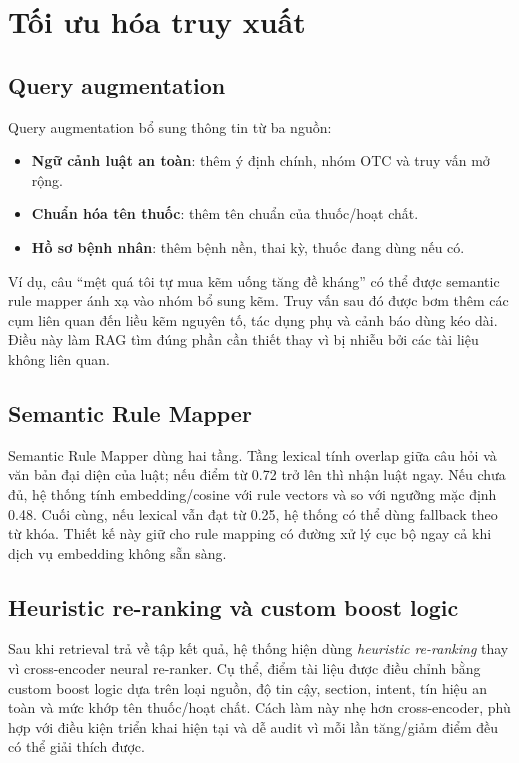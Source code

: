 \section{Tối ưu hóa truy xuất}

\subsection{Query augmentation}

Query augmentation bổ sung thông tin từ ba nguồn:

\begin{itemize}
  \item \textbf{Ngữ cảnh luật an toàn}: thêm ý định chính, nhóm OTC và truy vấn mở rộng.
  \item \textbf{Chuẩn hóa tên thuốc}: thêm tên chuẩn của thuốc/hoạt chất.
  \item \textbf{Hồ sơ bệnh nhân}: thêm bệnh nền, thai kỳ, thuốc đang dùng nếu có.
\end{itemize}

Ví dụ, câu ``mệt quá tôi tự mua kẽm uống tăng đề kháng'' có thể được semantic rule mapper ánh xạ vào nhóm bổ sung kẽm. Truy vấn sau đó được bơm thêm các cụm liên quan đến liều kẽm nguyên tố, tác dụng phụ và cảnh báo dùng kéo dài. Điều này làm RAG tìm đúng phần cần thiết thay vì bị nhiễu bởi các tài liệu không liên quan.

\subsection{Semantic Rule Mapper}

Semantic Rule Mapper dùng hai tầng. Tầng lexical tính overlap giữa câu hỏi và văn bản đại diện của luật; nếu điểm từ 0.72 trở lên thì nhận luật ngay. Nếu chưa đủ, hệ thống tính embedding/cosine với rule vectors và so với ngưỡng mặc định 0.48. Cuối cùng, nếu lexical vẫn đạt từ 0.25, hệ thống có thể dùng fallback theo từ khóa. Thiết kế này giữ cho rule mapping có đường xử lý cục bộ ngay cả khi dịch vụ embedding không sẵn sàng.

\subsection{Heuristic re-ranking và custom boost logic}

Sau khi retrieval trả về tập kết quả, hệ thống hiện dùng \textit{heuristic re-ranking} thay vì cross-encoder neural re-ranker. Cụ thể, điểm tài liệu được điều chỉnh bằng custom boost logic dựa trên loại nguồn, độ tin cậy, section, intent, tín hiệu an toàn và mức khớp tên thuốc/hoạt chất. Cách làm này nhẹ hơn cross-encoder, phù hợp với điều kiện triển khai hiện tại và dễ audit vì mỗi lần tăng/giảm điểm đều có thể giải thích được.

